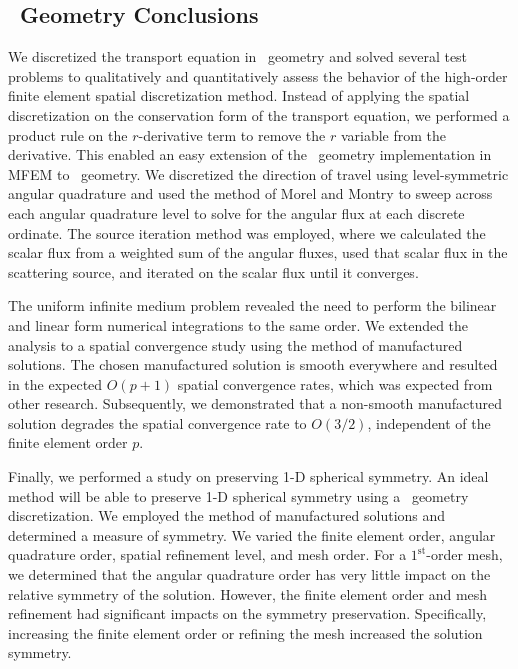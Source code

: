 \documentclass[12pt]{article}
\begin{document}
\subsection{\RZ\ Geometry Conclusions}
\label{sec:RZConclusions}
We discretized the transport equation in \RZ\ geometry and solved several test problems to qualitatively and quantitatively assess the behavior of the high-order finite element spatial discretization method. Instead of applying the spatial discretization on the conservation form of the transport equation, we performed a product rule on the $r$-derivative term to remove the $r$ variable from the derivative. This enabled an easy extension of the \XY\ geometry implementation in MFEM to \RZ\ geometry. We discretized the direction of travel using level-symmetric angular quadrature and used the method of Morel and Montry to sweep across each angular quadrature level to solve for the angular flux at each discrete ordinate. The source iteration method was employed, where we calculated the scalar flux from a weighted sum of the angular fluxes, used that scalar flux in the scattering source, and iterated on the scalar flux until it converges.

The uniform infinite medium problem revealed the need to perform the bilinear and linear form numerical integrations to the same order. We extended the analysis to a spatial convergence study using the method of manufactured solutions. The chosen manufactured solution is smooth everywhere and resulted in the expected $O(p+1)$ spatial convergence rates, which was expected from other research. Subsequently, we demonstrated that a non-smooth manufactured solution degrades the spatial convergence rate to $O(3/2)$, independent of the finite element order $p$.

Finally, we performed a study on preserving 1-D spherical symmetry. An ideal method will be able to preserve 1-D spherical symmetry using a \RZ\ geometry discretization. We employed the method of manufactured solutions and determined a measure of symmetry. We varied the finite element order, angular quadrature order, spatial refinement level, and mesh order. For a $1^\text{st}$-order mesh, we determined that the angular quadrature order has very little impact on the relative symmetry of the solution. However, the finite element order and mesh refinement had significant impacts on the symmetry preservation. Specifically, increasing the finite element order or refining the mesh increased the solution symmetry.
\end{document}
